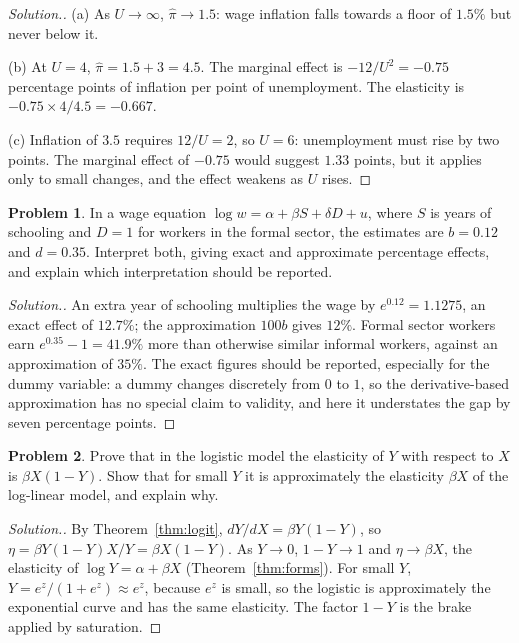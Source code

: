\documentclass[11pt,a4paper]{article}
\numberwithin{equation}{section}
\theoremstyle{definition}
\newtheorem{problemx}{Problem}[subsection]
\newenvironment{problem}{\begin{problemx}}{\end{problemx}}
\newenvironment{solution}
  {\renewcommand{\qedsymbol}{}\begin{proof}[\textit{Solution}.]}
  {\end{proof}}
\begin{document}
\begin{solution}
(a) As $U \to \infty$, $\hat\pi \to 1.5$: wage inflation falls towards a floor of $1.5\%$ but never below it.

(b) At $U = 4$, $\hat\pi = 1.5 + 3 = 4.5$. The marginal effect is $-12/U^2 = -0.75$ percentage points of inflation per point of unemployment. The
elasticity is $-0.75 \times 4/4.5 = -0.667$.

(c) Inflation of $3.5$ requires $12/U = 2$, so $U = 6$: unemployment must rise by two points. The marginal effect of $-0.75$ would suggest
$1.33$ points, but it applies only to small changes, and the effect weakens as $U$ rises.
\end{solution}

\begin{problem}
In a wage equation $\log w = \alpha + \beta S + \delta D + u$, where $S$ is years of schooling and $D = 1$ for workers in the formal sector, the
estimates are $b = 0.12$ and $d = 0.35$. Interpret both, giving exact and approximate percentage effects, and explain which interpretation should
be reported.
\end{problem}

\begin{solution}
An extra year of schooling multiplies the wage by $e^{0.12} = 1.1275$, an exact effect of $12.7\%$; the approximation $100b$ gives $12\%$. Formal
sector workers earn $e^{0.35} - 1 = 41.9\%$ more than otherwise similar informal workers, against an approximation of $35\%$. The exact figures
should be reported, especially for the dummy variable: a dummy changes discretely from $0$ to $1$, so the derivative-based approximation has no
special claim to validity, and here it understates the gap by seven percentage points.
\end{solution}

\begin{problem}
Prove that in the logistic model the elasticity of $Y$ with respect to $X$ is $\beta X(1 - Y)$. Show that for small $Y$ it is approximately the
elasticity $\beta X$ of the log-linear model, and explain why.
\end{problem}

\begin{solution}
By Theorem~\ref{thm:logit}, $dY/dX = \beta Y(1 - Y)$, so $\eta = \beta Y(1 - Y)X/Y = \beta X(1 - Y)$. As $Y \to 0$, $1 - Y \to 1$ and
$\eta \to \beta X$, the elasticity of $\log Y = \alpha + \beta X$ (Theorem~\ref{thm:forms}). For small $Y$, $Y = e^z/(1 + e^z) \approx e^z$, because $e^z$ is
small, so the logistic is approximately the exponential curve and has the same elasticity. The factor $1 - Y$ is the brake applied by saturation.
\end{solution}
\end{document}
